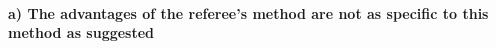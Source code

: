 \documentclass[a4paper,11pt]{article}
\begin{document}
%


\paragraph{a) The advantages of the referee's method are not as specific to this method as suggested}
\end{document}
